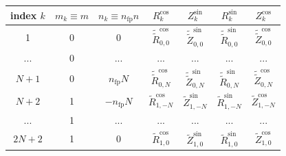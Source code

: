 \begin{table}[htb]
  \centering
  \begin{tabular}{c|c|c|c|c|c|c}
    index $k$ & $m_k \equiv m$ & $n_k \equiv n_\mathrm{fp} n$ &               $R_k^\mathrm{cos}$       &               $Z_k^\mathrm{sin}$       & {\color{blue}               $R_k^\mathrm{sin}$       } & {\color{blue}               $Z_k^\mathrm{cos}$       } \\
    \hline %
    1         & 0              & 0                            & $\tilde{\tilde{R}}_{0,0}^\mathrm{cos}$ & $\tilde{\tilde{Z}}_{0,0}^\mathrm{sin}$ & {\color{blue} $\tilde{\tilde{R}}_{0,0}^\mathrm{sin}$ } & {\color{blue} $\tilde{\tilde{Z}}_{0,0}^\mathrm{cos}$ } \\
    ...       & 0              & ...                          & ...                                    & ...                                    & {\color{blue} ...                                    } & {\color{blue} ...                                    } \\
    $N+1$     & 0              & $  n_\mathrm{fp} N$          & $\tilde{\tilde{R}}_{0,N}^\mathrm{cos}$ & $\tilde{\tilde{Z}}_{0,N}^\mathrm{sin}$ & {\color{blue} $\tilde{\tilde{R}}_{0,N}^\mathrm{sin}$ } & {\color{blue} $\tilde{\tilde{Z}}_{0,N}^\mathrm{cos}$ } \\
    \hline %
    $N+2$     & 1              & $- n_\mathrm{fp} N$          &        $\tilde{R}_{1,-N}^\mathrm{cos}$ &        $\tilde{Z}_{1,-N}^\mathrm{sin}$ & {\color{blue}        $\tilde{R}_{1,-N}^\mathrm{sin}$ } & {\color{blue}        $\tilde{Z}_{1,-N}^\mathrm{cos}$ } \\
    ...       & 1              & ...                          & ...                                    & ...                                    & {\color{blue} ...                                    } & {\color{blue} ...                                    } \\
    $2N+2$    & 1              & 0                            &        $\tilde{R}_{1, 0}^\mathrm{cos}$ &        $\tilde{Z}_{1, 0}^\mathrm{sin}$ & {\color{blue}        $\tilde{R}_{1, 0}^\mathrm{sin}$ } & {\color{blue}        $\tilde{Z}_{1, 0}^\mathrm{cos}$ } \\

\end{tabular}
\end{table}
